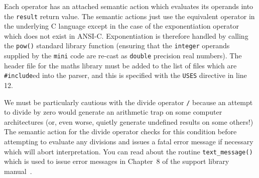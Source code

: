 Each operator has an attached semantic action which
evaluates its operands into the {\tt result} return value. The semantic
actions just use the equivalent operator in the underlying C language
except in the case of the exponentiation operator which does not exist
in ANSI-C. Exponentiation is therefore handled by calling the {\tt pow()} standard
library function (ensuring that the {\tt integer} operands supplied by
the {\tt mini} code are re-cast as {\tt double} precision real numbers).
The header file for the maths library must be added to the list of files which are 
\verb+#include+ed into the parser, and this is specified with the {\tt USES} directive 
in line 12.

We must be particularly cautious with the divide operator {\tt /} because an attempt to divide
by zero would generate an arithmetic trap
on some computer architectures (or, even worse, quietly
generate undefined results on some others!) The semantic action for the divide operator
checks for this condition before attempting to evaluate any divisions and issues a fatal
error message if necessary which will abort interpretation. You can read about the routine
\verb+text_message()+ which is used to issue error messages in Chapter~8 of the support
library manual~\cite{rdp:supp:1.5}.

